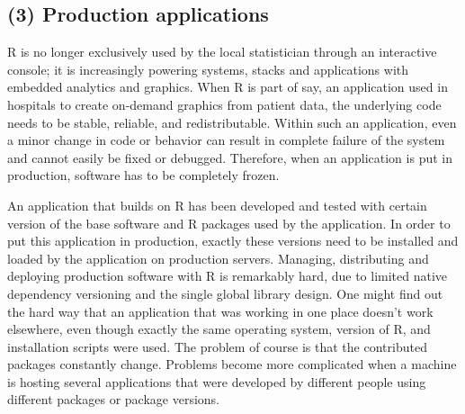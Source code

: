 \subsection{(3) Production applications}

R is no longer exclusively used by the local statistician through an
interactive console; it is increasingly powering systems, stacks and
applications with embedded analytics and graphics. When R is part of say, an
application used in hospitals to create on-demand graphics from patient data,
the underlying code needs to be stable, reliable, and redistributable. Within
such an application, even a minor change in code or behavior can result in
complete failure of the system and cannot easily be fixed or debugged.
Therefore, when an application is put in production, software has to be
completely frozen.


An application that builds on R has been developed and tested with certain
version of the base software and R packages used by the application. In order
to put this application in production, exactly these versions need to be
installed and loaded by the application on production servers. Managing,
distributing and deploying production software with R is remarkably hard, due
to limited native dependency versioning and the single global library design.
One might find out the hard way that an application that was working in one
place doesn't work elsewhere, even though exactly the same operating system,
version of R, and installation scripts were used. The problem of course is that
the contributed packages constantly change. Problems become more complicated
when a machine is hosting several applications that were developed by different
people using different packages or package versions.

